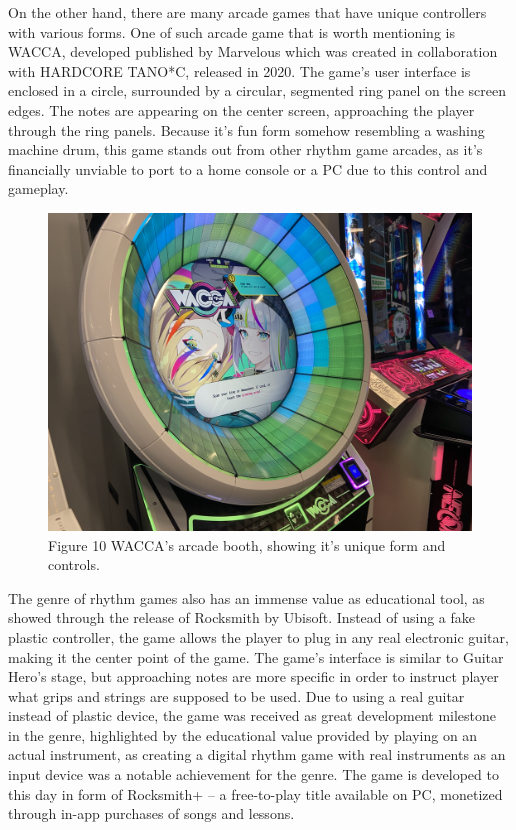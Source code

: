 On the other hand, there are many arcade games that have unique controllers with various forms. 
One of such arcade game that is worth mentioning is WACCA, developed published by Marvelous which was created in collaboration with HARDCORE TANO*C, released in 2020. The game's user interface is enclosed in a circle, surrounded by a circular, segmented ring panel on the screen edges. The notes are appearing on the center screen, approaching the player through the ring panels. Because it's fun form somehow resembling a washing machine drum, this game stands out from other rhythm game arcades, as it's financially unviable to port to a home console or a PC due to this control and gameplay.
\pagebreak

\begin{figure}[h]
    \centering\includegraphics[scale=0.1]{obrazki/waccaarcade.jpg}
    \caption{Figure 10 WACCA's arcade booth, showing it's unique form and controls. \cite{waccaarcade}}
    \label{fig:wacca_arcade}
\end{figure}

The genre of rhythm games also has an immense value as educational tool, as showed through the release of Rocksmith by Ubisoft. Instead of using a fake plastic controller, the game allows the player to plug in any real electronic guitar, making it the center point of the game. The game's interface is similar to Guitar Hero's stage, but approaching notes are more specific in order to instruct player what grips and strings are supposed to be used. Due to using a real guitar instead of plastic device, the game was received as great development milestone in the genre, highlighted by the educational value provided by playing on an actual instrument, as creating a digital rhythm game with real instruments as an input device was a notable achievement for the genre. The game is developed to this day in form of Rocksmith+ -- a free-to-play title available on PC, monetized through in-app purchases of songs and lessons.

